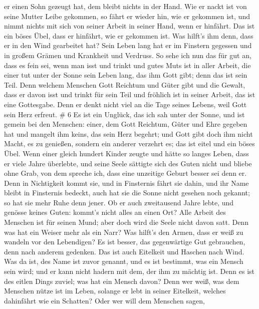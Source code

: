 er einen Sohn gezeugt hat, dem bleibt nichts in der Hand. 
Wie er nackt ist von seine Mutter Leibe gekommen, so fährt er wieder
hin, wie er gekommen ist, und nimmt nichts mit sich von seiner Arbeit in
seiner Hand, wenn er hinfährt.  Das ist ein böses Übel,
dass er hinfährt, wie er gekommen ist. Was hilft's ihm denn, dass er in
den Wind gearbeitet hat?  Sein Leben lang hat er im
Finstern gegessen und in großem Grämen und Krankheit und Verdruss.
 So sehe ich nun das für gut an, dass es fein sei, wenn man
isst und trinkt und gutes Muts ist in aller Arbeit, die einer tut unter
der Sonne sein Leben lang, das ihm Gott gibt; denn das ist sein Teil.
 Denn welchem Menschen Gott Reichtum und Güter gibt und die
Gewalt, dass er davon isst und trinkt für sein Teil und fröhlich ist in
seiner Arbeit, das ist eine Gottesgabe.  Denn er denkt
nicht viel an die Tage seines Lebens, weil Gott sein Herz erfreut. \# 6
 Es ist ein Unglück, das ich sah unter der Sonne, und ist
gemein bei den Menschen:  einer, dem Gott Reichtum, Güter
und Ehre gegeben hat und mangelt ihm keins, das sein Herz begehrt; und
Gott gibt doch ihm nicht Macht, es zu genießen, sondern ein anderer
verzehrt es; das ist eitel und ein böses Übel.  Wenn einer
gleich hundert Kinder zeugte und hätte so langes Leben, dass er viele
Jahre überlebte, und seine Seele sättigte sich des Guten nicht und
bliebe ohne Grab, von dem spreche ich, dass eine unzeitige Geburt besser
sei denn er.  Denn in Nichtigkeit kommt sie, und in
Finsternis fährt sie dahin, und ihr Name bleibt in Finsternis bedeckt,
 auch hat sie die Sonne nicht gesehen noch gekannt; so hat
sie mehr Ruhe denn jener.  Ob er auch zweitausend Jahre
lebte, und genösse keines Guten: kommt's nicht alles an einen Ort?
 Alle Arbeit des Menschen ist für seinen Mund; aber doch
wird die Seele nicht davon satt.  Denn was hat ein Weiser
mehr als ein Narr? Was hilft's den Armen, dass er weiß zu wandeln vor
den Lebendigen?  Es ist besser, das gegenwärtige Gut
gebrauchen, denn nach anderem gedenken. Das ist auch Eitelkeit und
Haschen nach Wind.  Was da ist, des Name ist zuvor genannt,
und es ist bestimmt, was ein Mensch sein wird; und er kann nicht hadern
mit dem, der ihm zu mächtig ist.  Denn es ist des eitlen
Dings zuviel; was hat ein Mensch davon?  Denn wer weiß, was
dem Menschen nütze ist im Leben, solange er lebt in seiner Eitelkeit,
welches dahinfährt wie ein Schatten? Oder wer will dem Menschen sagen,
